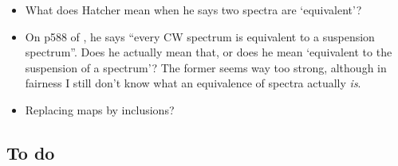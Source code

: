\documentclass{MetricNotes2023}
\def\bb{\ensuremath\mathbb}
\def\subq{\ensuremath\subseteq}
\def\inte{\ensuremath\mathbb{Z}}
\DeclareMathOperator{\colim}{colim}
\begin{document}
\begin{itemize}


\item What does Hatcher mean when he says two spectra are `equivalent'?

\item On p588 of \autocite{hatcher5}, he says ``every CW spectrum is equivalent to a suspension spectrum''. Does he actually mean that, or does he mean `equivalent to the suspension of a spectrum'? The former seems way too strong, although in fairness I still don't know what an equivalence of spectra actually \textit{is}. 

\item Replacing maps by inclusions?
\end{itemize}

\subsection{To do}
\end{document}

